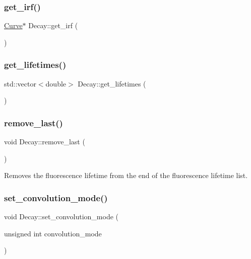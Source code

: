 \mbox{\label{class_decay_a538397addc1291d487ea446428dc989e}} 
\subsubsection{\texorpdfstring{get\+\_\+irf()}{get\_irf()}}
{\footnotesize\ttfamily \hyperlink{class_curve}{Curve}$\ast$ Decay\+::get\+\_\+irf (\begin{DoxyParamCaption}{ }\end{DoxyParamCaption})}

\mbox{\label{class_decay_aaeb275e54ffc2de5bbe1df6e99221e7e}} 
\subsubsection{\texorpdfstring{get\+\_\+lifetimes()}{get\_lifetimes()}}
{\footnotesize\ttfamily std\+::vector$<$double$>$ Decay\+::get\+\_\+lifetimes (\begin{DoxyParamCaption}{ }\end{DoxyParamCaption})}

\mbox{\label{class_decay_a46e478fb53a701f9a33f33c8abe5caf9}} 
\subsubsection{\texorpdfstring{remove\+\_\+last()}{remove\_last()}}
{\footnotesize\ttfamily void Decay\+::remove\+\_\+last (\begin{DoxyParamCaption}{ }\end{DoxyParamCaption})}

Removes the fluorescence lifetime from the end of the fluorescence lifetime list. \mbox{\label{class_decay_a2a097da42db1a9e6cff3d82a03c04953}} 
\subsubsection{\texorpdfstring{set\+\_\+convolution\+\_\+mode()}{set\_convolution\_mode()}}
{\footnotesize\ttfamily void Decay\+::set\+\_\+convolution\+\_\+mode (\begin{DoxyParamCaption}\item[{unsigned int}]{convolution\+\_\+mode }\end{DoxyParamCaption})}

